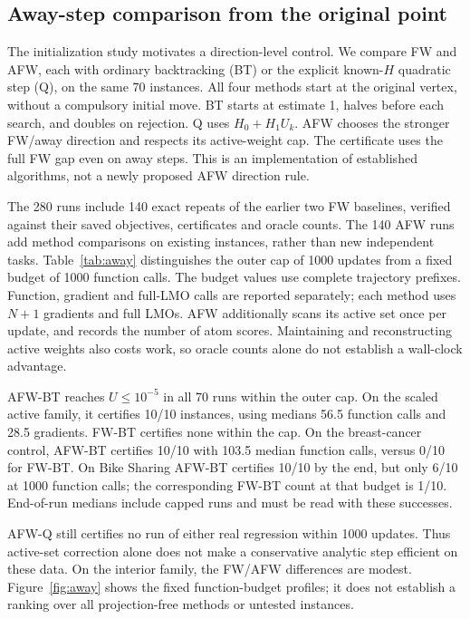 \subsection{Away-step comparison from the original point}
The initialization study motivates a direction-level control. We compare
FW and AFW, each with ordinary backtracking (BT) or the explicit
known-$H$ quadratic step (Q), on the same 70 instances. All four methods
start at the original vertex, without a compulsory initial move.
BT starts at estimate 1, halves before each search, and doubles on
rejection. Q uses $H_0+H_1U_k$. AFW chooses the stronger FW/away
direction and respects its active-weight cap. The certificate uses the
full FW gap even on away steps. This is an implementation of established
algorithms, not a newly proposed AFW direction rule.

The 280 runs include 140 exact repeats of the earlier two FW baselines,
verified against their saved objectives, certificates and oracle counts.
The 140 AFW runs add method comparisons on existing instances, rather
than new independent tasks. Table~\ref{tab:away} distinguishes the
outer cap of 1000 updates from a fixed budget of 1000 function calls.
The budget values use complete trajectory prefixes. Function, gradient
and full-LMO calls are reported separately; each method uses $N+1$
gradients and full LMOs. AFW additionally scans its active set once per
update, and records the number of atom scores. Maintaining and
reconstructing active weights also costs work, so oracle counts alone
do not establish a wall-clock advantage.

AFW-BT reaches $U\le10^{-5}$ in all 70 runs within the outer cap.
On the scaled active family, it certifies 10/10 instances, using medians
56.5 function calls and 28.5 gradients. FW-BT certifies none within the
cap. On the breast-cancer control, AFW-BT certifies 10/10 with 103.5
median function calls, versus 0/10 for FW-BT. On Bike Sharing AFW-BT
certifies 10/10 by the end, but only 6/10 at 1000 function calls; the
corresponding FW-BT count at that budget is 1/10. End-of-run medians
include capped runs and must be read with these successes.

AFW-Q still certifies no run of either real regression within 1000
updates. Thus active-set correction alone does not make a conservative
analytic step efficient on these data. On the interior family, the
FW/AFW differences are modest. Figure~\ref{fig:away} shows the fixed
function-budget profiles; it does not establish a ranking over all
projection-free methods or untested instances.

